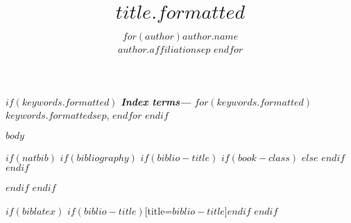\documentclass[12pt,a4paper, twoside=true, BCOR=5mm]{scrbook}
\author{
$for(author)$$author.name$\\$author.affiliation$$sep$ \And $endfor$
}
\title{$title.formatted$}
\providecommand{\Keywords}[1]{\textbf{\textit{Index terms---}} #1}
\begin{document}
$if(keywords.formatted)$
\Keywords{$for(keywords.formatted)$$keywords.formatted$$sep$, $endfor$}
$endif$

$body$

$if(natbib)$
$if(bibliography)$
$if(biblio-title)$
$if(book-class)$
\renewcommand\bibname{$biblio-title$}
$else$
\renewcommand\refname{$biblio-title$}
$endif$
$endif$

$endif$
$endif$

$if(biblatex)$
\printbibliography$if(biblio-title)$[title=$biblio-title$]$endif$
$endif$
\end{document}
